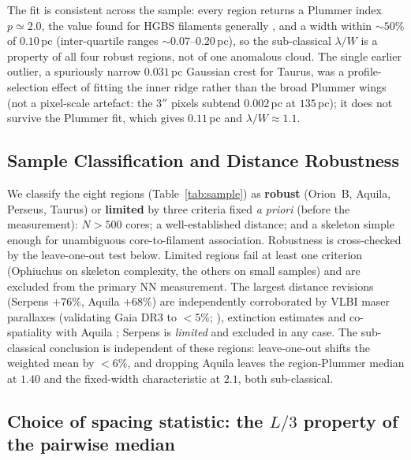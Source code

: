 \documentclass[usenatbib,twoside,twocolumn]{mnras}
\begin{document}
The fit is consistent across the sample: every region returns a Plummer index $p\simeq2.0$, the value found for HGBS filaments generally \citep{Arzoumanian2019}, and a width within $\sim50\%$ of $0.10$\,pc (inter-quartile ranges $\sim0.07$--$0.20$\,pc), so the sub-classical $\lambda/W$ is a property of all four robust regions, not of one anomalous cloud. The single earlier outlier, a spuriously narrow $0.031$\,pc Gaussian crest for Taurus, was a profile-selection effect of fitting the inner ridge rather than the broad Plummer wings (not a pixel-scale artefact: the $3''$ pixels subtend $0.002$\,pc at $135$\,pc); it does not survive the Plummer fit, which gives $0.11$\,pc and $\lambda/W\approx1.1$.

\subsection{Sample Classification and Distance Robustness}
\label{sec:distance_uncertainties}

We classify the eight regions (Table~\ref{tab:sample}) as \textbf{robust} (Orion~B, Aquila, Perseus, Taurus) or \textbf{limited} by three criteria fixed \emph{a priori} (before the measurement): $N>500$ cores; a well-established distance; and a skeleton simple enough for unambiguous core-to-filament association. Robustness is cross-checked by the leave-one-out test below. Limited regions fail at least one criterion (Ophiuchus on skeleton complexity, the others on small samples) and are excluded from the primary NN measurement. The largest distance revisions (Serpens $+76\%$, Aquila $+68\%$) are independently corroborated by VLBI maser parallaxes (validating Gaia DR3 to $<5\%$; \citealt{Kounkel2018,Xu2021,OrtizLeon2018,OrtizLeon2017}), extinction estimates \citep{Yan2022,Green2024} and co-spatiality with Aquila \citep{Zucker2020}; Serpens is \emph{limited} and excluded in any case. The sub-classical conclusion is independent of these regions: leave-one-out shifts the weighted mean by $<6\%$, and dropping Aquila leaves the region-Plummer median at $1.40$ and the fixed-width characteristic at $2.1$, both sub-classical.


\subsection{Choice of spacing statistic: the $L/3$ property of the pairwise median}
\label{sec:statistics}
\end{document}
